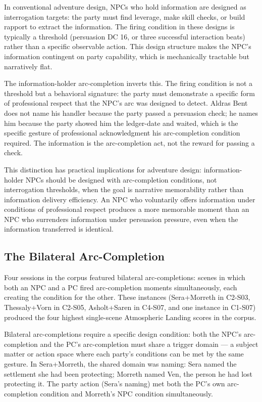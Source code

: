 In conventional adventure design, NPCs who hold information are designed as
interrogation targets: the party must find leverage, make skill checks, or
build rapport to extract the information. The firing condition in these
designs is typically a threshold (persuasion DC 16, or three successful
interaction beats) rather than a specific observable action. This design
structure makes the NPC's information contingent on party capability, which
is mechanically tractable but narratively flat.

The information-holder arc-completion inverts this. The firing condition is
not a threshold but a behavioral signature: the party must demonstrate a
specific form of professional respect that the NPC's arc was designed to
detect. Aldras Bent does not name his handler because the party passed a
persuasion check; he names him because the party showed him the ledger-date
and waited, which is the specific gesture of professional acknowledgment his
arc-completion condition required. The information is the arc-completion act,
not the reward for passing a check.

This distinction has practical implications for adventure design: information-
holder NPCs should be designed with arc-completion conditions, not interrogation
thresholds, when the goal is narrative memorability rather than information
delivery efficiency. An NPC who voluntarily offers information under conditions
of professional respect produces a more memorable moment than an NPC who
surrenders information under persuasion pressure, even when the information
transferred is identical.

\subsection{The Bilateral Arc-Completion}

Four sessions in the corpus featured bilateral arc-completions: scenes in which
both an NPC and a PC fired arc-completion moments simultaneously, each creating
the condition for the other. These instances (Sera+Morreth in C2-S03,
Thessaly+Vorn in C2-S05, Asholt+Saren in C4-S07, and one instance in C1-S07)
produced the four highest single-scene Atmospheric Landing scores in the corpus.

Bilateral arc-completions require a specific design condition: both the NPC's
arc-completion and the PC's arc-completion must share a trigger domain --- a
subject matter or action space where each party's conditions can be met by the
same gesture. In Sera+Morreth, the shared domain was naming: Sera named the
settlement she had been protecting; Morreth named Ven, the person he had lost
protecting it. The party action (Sera's naming) met both the PC's own arc-
completion condition and Morreth's NPC condition simultaneously.

